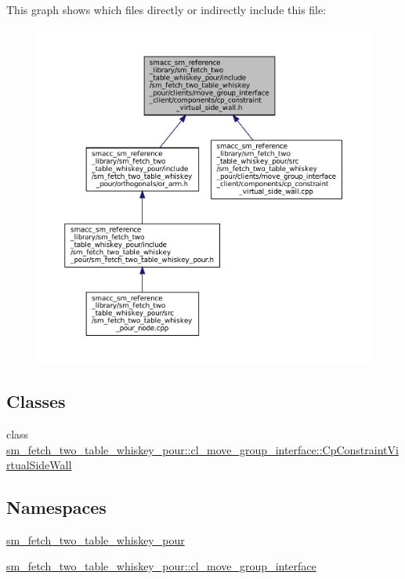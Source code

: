 This graph shows which files directly or indirectly include this file\+:
\nopagebreak
\begin{figure}[H]
\begin{center}
\leavevmode
\includegraphics[width=350pt]{sm__fetch__two__table__whiskey__pour_2include_2sm__fetch__two__table__whiskey__pour_2clients_2mobad73766912c6439a268fd3307a529e4}
\end{center}
\end{figure}
\subsection*{Classes}
\begin{DoxyCompactItemize}
\item 
class \hyperlink{classsm__fetch__two__table__whiskey__pour_1_1cl__move__group__interface_1_1CpConstraintVirtualSideWall}{sm\+\_\+fetch\+\_\+two\+\_\+table\+\_\+whiskey\+\_\+pour\+::cl\+\_\+move\+\_\+group\+\_\+interface\+::\+Cp\+Constraint\+Virtual\+Side\+Wall}
\end{DoxyCompactItemize}
\subsection*{Namespaces}
\begin{DoxyCompactItemize}
\item 
 \hyperlink{namespacesm__fetch__two__table__whiskey__pour}{sm\+\_\+fetch\+\_\+two\+\_\+table\+\_\+whiskey\+\_\+pour}
\item 
 \hyperlink{namespacesm__fetch__two__table__whiskey__pour_1_1cl__move__group__interface}{sm\+\_\+fetch\+\_\+two\+\_\+table\+\_\+whiskey\+\_\+pour\+::cl\+\_\+move\+\_\+group\+\_\+interface}
\end{DoxyCompactItemize}
